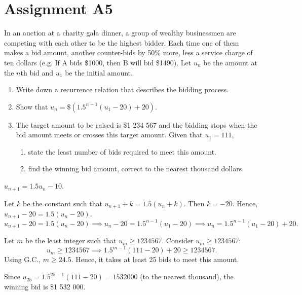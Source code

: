 \clearpage
\section{Assignment A5}

\begin{problem}
    In an auction at a charity gala dinner, a group of wealthy businessmen are competing with each other to be the highest bidder. Each time one of them makes a bid amount, another counter-bids by 50\% more, less a service charge of ten dollars (e.g. If A bids \$1000, then B will bid \$1490). Let $u_n$ be the amount at the $n$th bid and $u_1$ be the initial amount.

    \begin{enumerate}
        \item Write down a recurrence relation that describes the bidding process.
        \item Show that $u_n = \$(1.5^{n-1} (u_1 - 20) + 20)$.
        \item The target amount to be raised is \$1 234 567 and the bidding stops when the bid amount meets or crosses this target amount. Given that $u_1 = 111$,
        \begin{enumerate}
            \item state the least number of bids required to meet this amount.
            \item find the winning bid amount, correct to the nearest thousand dollars.
        \end{enumerate}
    \end{enumerate}
\end{problem}
\begin{solution}
    \begin{ppart}
        $u_{n+1} = 1.5u_n - 10$.
    \end{ppart}
    \begin{ppart}
        Let $k$ be the constant such that $u_{n+1} + k = 1.5(u_n + k)$. Then $k = -20$. Hence, $u_{n+1} - 20 = 1.5(u_n - 20)$. \[u_{n+1} - 20 = 1.5(u_n - 20) \implies u_n - 20 = 1.5^{n-1}(u_1 - 20) \implies u_n = 1.5^{n-1}(u_1 - 20) + 20.\]
    \end{ppart}
    \begin{ppart}
        \begin{psubpart}
            Let $m$ be the least integer such that $u_m \geq 1234567$. Consider $u_m \geq 1234567$: \[u_m \geq 1234567 \implies 1.5^{m-1}(111 - 20) + 20 \geq 1234567.\] Using G.C., $m \geq 24.5$. Hence, it takes at least 25 bids to meet this amount.
        \end{psubpart}
        \begin{psubpart}
            Since $u_{25} = 1.5^{25-1}(111 - 20) = 1532000$ (to the nearest thousand), the winning bid is \$1 532 000.
        \end{psubpart}
    \end{ppart}
\end{solution}


